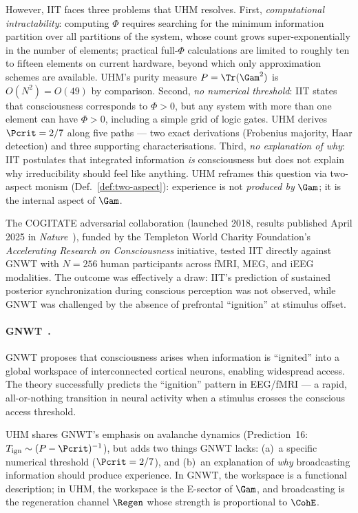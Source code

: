 However, IIT faces three problems that UHM resolves. First, \emph{computational
intractability}: computing $\Phi$ requires searching for the minimum information
partition over all partitions of the system, whose count grows super-exponentially
in the number of elements; practical full-$\Phi$ calculations are limited to roughly
ten to fifteen elements on current hardware, beyond which only approximation schemes
are available. UHM's purity measure $P = \Tr(\Gam^2)$ is $O(N^2) = O(49)$ by
comparison. Second, \emph{no numerical threshold}: IIT states that consciousness
corresponds to $\Phi > 0$, but any system with more than one element can have
$\Phi > 0$, including a simple grid of logic gates. UHM derives $\Pcrit = 2/7$ along
five paths --- two exact derivations (Frobenius majority, Haar detection) and three
supporting characterisations. Third, \emph{no explanation of why}: IIT postulates
that integrated information \emph{is} consciousness but does not explain why
irreducibility should feel like anything. UHM reframes this question via
two-aspect monism (Def.~\ref{def:two-aspect}): experience is not \emph{produced
by} $\Gam$; it is the internal aspect of $\Gam$.

The COGITATE adversarial collaboration (launched 2018, results published April 2025
in \emph{Nature}~\cite{cogitate2025}), funded by the Templeton World Charity Foundation's
\emph{Accelerating Research on Consciousness} initiative, tested IIT directly against
GNWT with $N = 256$ human participants across fMRI, MEG, and iEEG modalities. The
outcome was effectively a draw: IIT's prediction of sustained posterior synchronization
during conscious perception was not observed, while GNWT was challenged by the absence
of prefrontal ``ignition'' at stimulus offset.

\paragraph{GNWT~\cite{dehaene2011}.}
GNWT proposes that consciousness arises when information is ``ignited'' into a global
workspace of interconnected cortical neurons, enabling widespread access. The theory
successfully predicts the ``ignition'' pattern in EEG/fMRI --- a rapid, all-or-nothing
transition in neural activity when a stimulus crosses the conscious access threshold.

UHM shares GNWT's emphasis on avalanche dynamics (Prediction~16:
$T_{\mathrm{ign}} \sim (P - \Pcrit)^{-1}$), but adds two things GNWT lacks: (a)~a
specific numerical threshold ($\Pcrit = 2/7$), and (b)~an explanation of \emph{why}
broadcasting information should produce experience. In GNWT, the workspace is a functional
description; in UHM, the workspace is the E-sector of $\Gam$, and broadcasting is the
regeneration channel $\Regen$ whose strength is proportional to $\CohE$.

